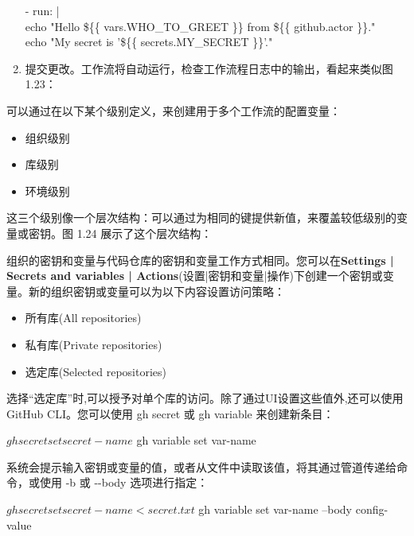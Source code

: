 \begin{enumerate}
\begin{tcolorbox}[ breakable,colback = bashcodebg, colframe= black!50!white]
\scriptsize{
- run: | \\
\hspace*{2em}echo "Hello \$\{\{ vars.WHO\_TO\_GREET \}\}  from \$\{\{ github.actor \}\}." \\
\hspace*{2em}echo "My secret is  '\$\{\{ secrets.MY\_SECRET \}\}'."
}
\end{tcolorbox}

\item 
提交更改。工作流将自动运行，检查工作流程日志中的输出，看起来类似图 1.23：


\end{enumerate}


可以通过在以下某个级别定义，来创建用于多个工作流的配置变量：

\begin{itemize}
\item 
组织级别

\item 
库级别

\item 
环境级别
\end{itemize}

这三个级别像一个层次结构：可以通过为相同的键提供新值，来覆盖较低级别的变量或密钥。图 1.24 展示了这个层次结构：


组织的密钥和变量与代码仓库的密钥和变量工作方式相同。您可以在\textbf{Settings | Secrets and variables | Actions}(设置|密钥和变量|操作)下创建一个密钥或变量。新的组织密钥或变量可以为以下内容设置访问策略：

\begin{itemize}
\item 
所有库(All repositories)

\item 
私有库(Private repositories)

\item 
选定库(Selected repositories)
\end{itemize}

选择“选定库”时,可以授予对单个库的访问。除了通过UI设置这些值外,还可以使用GitHub CLI。您可以使用 gh secret 或 gh variable 来创建新条目：

\begin{shell}
$ gh secret set secret-name
$ gh variable set var-name
\end{shell}

系统会提示输入密钥或变量的值，或者从文件中读取该值，将其通过管道传递给命令，或使用 -b 或 -{}-body 选项进行指定：

\begin{shell}
$ gh secret set secret-name < secret.txt
$ gh variable set var-name --body config-value
\end{shell}
